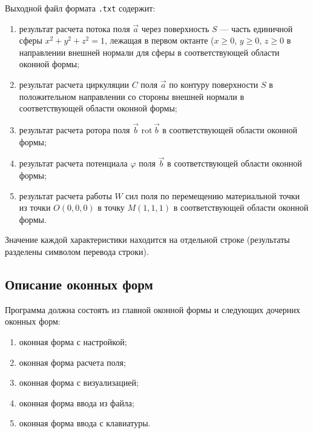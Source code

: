 \documentclass[14pt,a4paper,final]{extreport}
\begin{document}
\pagebreak %


Выходной файл формата \texttt{.txt} содержит:
\begin{enumerate}[label=\asbuk*),ref=\asbuk*]
	\item результат расчета потока поля \( \vec a \) через поверхность \( S \) --- часть единичной сферы \(x^2 + y^2 + z^2 = 1 \), лежащая в первом октанте (\( x \geq 0 \), \( y \geq 0 \), \( z \geq 0 \) в направлении внешней нормали для сферы в соответствующей области оконной формы;
	\item результат расчета циркуляции \( C \) поля \( \vec a \) по контуру поверхности \( S \) в положительном направлении со стороны внешней нормали в соответствующей области оконной формы;
	\item результат расчета ротора поля \( \vec b \) \( \mathrm{rot}\,\vec b \) в соответствующей области оконной формы;
	\item результат расчета потенциала \( \varphi \) поля \( \vec b \) в соответствующей области оконной формы;
	\item результат расчета работы \( W \) сил поля по перемещению материальной точки из точки \(O(0,0,0) \) в точку \( M(1,1,1) \) в соответствующей области оконной формы.
\end{enumerate}

Значение каждой характеристики находится на отдельной строке (результаты разделены символом перевода строки).

\subsection{Описание оконных форм}
Программа должна состоять из главной оконной формы и следующих дочерних оконных форм:
\begin{enumerate}[label=\arabic*.,ref=\arabic*]
	\item оконная форма с настройкой;
	\item оконная форма расчета поля;
	\item оконная форма с визуализацией;
	\item оконная форма ввода из файла;
	\item оконная форма ввода с клавиатуры.
\end{enumerate}
\end{document}
